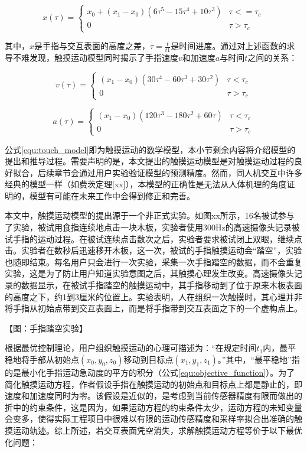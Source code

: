 \begin{equation}
	x(\tau)=
	\begin{cases}
		x_0+(x_1-x_0)(6\tau^5-15\tau^4+10\tau^3)& \tau<=\tau_c \\
		0& \tau>\tau_c
	\end{cases}
\label{equ:touch_model}
\end{equation}

其中，$x$是手指与交互表面的高度之差，$\tau=\frac{t}{t1}$是时间进度。通过对上述函数的求导不难发现，触摸运动模型同时揭示了手指速度$v$和加速度$a$与时间$t$之间的关系：

\begin{equation}
v(\tau)=
\begin{cases}
	(x_1-x_0)(30\tau^4-60\tau^3+30\tau^2)& \tau<\tau_c \\
	0& \tau>\tau_c
\end{cases}
\end{equation}

\begin{equation}
	a(\tau)=
	\begin{cases}
		(x_1-x_0)(120\tau^3-180\tau^2+60\tau)& \tau<\tau_c \\
		0& \tau>\tau_c
	\end{cases}
\label{equ:touch_model_a}
\end{equation}

公式\ref{equ:touch_model}即为触摸运动的数学模型，本小节剩余内容将介绍模型的提出和推导过程。需要声明的是，本文提出的触摸运动模型是对触摸运动过程的良好拟合，后续章节会通过用户实验验证模型的预测精度。然而，同人机交互中许多经典的模型一样（如费茨定理[xx]），本模型的正确性是无法从人体机理的角度证明的，模型有可能在未来工作中会得到修正和完善。

本文中，触摸运动模型的提出源于一个非正式实验。如图xx所示，16名被试参与了实验，被试用食指连续地点击一块木板，实验者使用300Hz的高速摄像头记录被试手指的运动过程。在被试连续点击数次之后，实验者要求被试闭上双眼，继续点击。实验者在数秒后迅速移开木板，这一次，被试的手指触摸运动会“踏空”，实验也随即结束。每名用户只会进行一次实验，采集一次手指踏空的数据，而不会重复实验，这是为了防止用户知道实验意图之后，其触摸心理发生改变。高速摄像头记录的数据显示，在被试手指踏空的触摸运动中，其手指移动到了位于原来木板表面的高度之下，约1到3厘米的位置上。实验表明，人在组织一次触摸时，其心理并非将手指从初始点带到交互表面上，而是将手指带到交互表面之下的一个虚构点上。

【图：手指踏空实验】

根据最优控制理论，用户组织触摸运动的心理可描述为：“在规定时间$t_1$内，最平稳地将手部从初始点$(x_0, y_0, z_0)$移动到目标点$(x_1, y_1, z_1)$。”其中，“最平稳地”指的是最小化手指运动急动度的平方的积分（公式\ref{equ:objective_function}）。为了简化触摸运动方程，作者假设手指在触摸运动的初始点和目标点上都是静止的，即速度和加速度同时为零。该假设是近似的，是考虑到当前传感器精度有限而做出的折中的约束条件，这是因为，如果运动方程的约束条件太少，运动方程的未知变量会变多，使得实际工程项目中很难以有限的运动传感精度和采样率拟合出准确的触摸运动轨迹。综上所述，若交互表面凭空消失，求解触摸运动方程等价于以下最优化问题：

